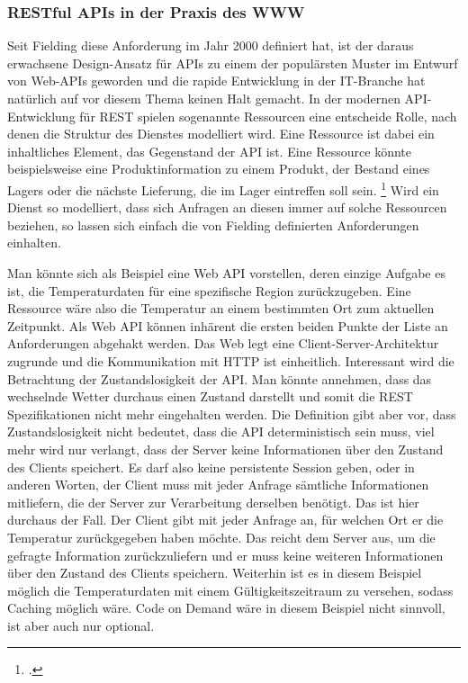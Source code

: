 \subsubsection*{RESTful APIs in der Praxis des WWW}
Seit Fielding diese Anforderung im Jahr 2000 definiert hat, ist der daraus erwachsene Design-Ansatz für APIs zu einem der populärsten Muster im Entwurf von Web-APIs geworden und die rapide Entwicklung in der IT-Branche hat natürlich auf vor diesem Thema keinen Halt gemacht. In der modernen API-Entwicklung für REST spielen sogenannte Ressourcen eine entscheide Rolle, nach denen die Struktur des Dienstes modelliert wird. Eine Ressource ist dabei ein inhaltliches Element, das Gegenstand der API ist. Eine Ressource könnte beispielsweise eine Produktinformation zu einem Produkt, der Bestand eines Lagers oder die nächste Lieferung, die im Lager eintreffen soll sein. \footcite[Vgl.][S. 81]{richardson2007web} Wird ein Dienst so modelliert, dass sich Anfragen an diesen immer auf solche Ressourcen beziehen, so lassen sich einfach die von Fielding definierten Anforderungen einhalten.

Man könnte sich als Beispiel eine Web API vorstellen, deren einzige Aufgabe es ist, die Temperaturdaten für eine spezifische Region zurückzugeben. Eine Ressource wäre also die Temperatur an einem bestimmten Ort zum aktuellen Zeitpunkt. Als Web API können inhärent die ersten beiden Punkte der Liste an Anforderungen abgehakt werden. Das Web legt eine Client-Server-Architektur zugrunde und die Kommunikation mit HTTP ist einheitlich. Interessant wird die Betrachtung der Zustandslosigkeit der API. Man könnte annehmen, dass das wechselnde Wetter durchaus einen Zustand darstellt und somit die REST Spezifikationen nicht mehr eingehalten werden. Die Definition gibt aber vor, dass Zustandslosigkeit nicht bedeutet, dass die API deterministisch sein muss, viel mehr wird nur verlangt, dass der Server keine Informationen über den Zustand des Clients speichert. Es darf also keine persistente Session geben, oder in anderen Worten, der Client muss mit jeder Anfrage sämtliche Informationen mitliefern, die der Server zur Verarbeitung derselben benötigt. Das ist hier durchaus der Fall. Der Client gibt mit jeder Anfrage an, für welchen Ort er die Temperatur zurückgegeben haben möchte. Das reicht dem Server aus, um die gefragte Information zurückzuliefern und er muss keine weiteren Informationen über den Zustand des Clients speichern. Weiterhin ist es in diesem Beispiel möglich die Temperaturdaten mit einem Gültigkeitszeitraum zu versehen, sodass Caching möglich wäre. Code on Demand wäre in diesem Beispiel nicht sinnvoll, ist aber auch nur optional.
